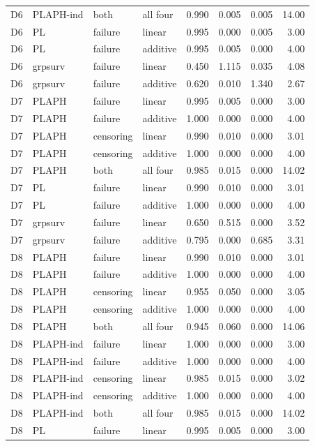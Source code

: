 \begin{longtable}{clllrrrr}
D6 & PLAPH-ind & both & all four & 0.990 & 0.005 & 0.005 & 14.00 \\
D6 & PL & failure & linear & 0.995 & 0.000 & 0.005 & 3.00 \\
D6 & PL & failure & additive & 0.995 & 0.005 & 0.000 & 4.00 \\
D6 & grpsurv & failure & linear & 0.450 & 1.115 & 0.035 & 4.08 \\
D6 & grpsurv & failure & additive & 0.620 & 0.010 & 1.340 & 2.67 \\
D7 & PLAPH & failure & linear & 0.995 & 0.005 & 0.000 & 3.00 \\
D7 & PLAPH & failure & additive & 1.000 & 0.000 & 0.000 & 4.00 \\
D7 & PLAPH & censoring & linear & 0.990 & 0.010 & 0.000 & 3.01 \\
D7 & PLAPH & censoring & additive & 1.000 & 0.000 & 0.000 & 4.00 \\
D7 & PLAPH & both & all four & 0.985 & 0.015 & 0.000 & 14.02 \\
D7 & PL & failure & linear & 0.990 & 0.010 & 0.000 & 3.01 \\
D7 & PL & failure & additive & 1.000 & 0.000 & 0.000 & 4.00 \\
D7 & grpsurv & failure & linear & 0.650 & 0.515 & 0.000 & 3.52 \\
D7 & grpsurv & failure & additive & 0.795 & 0.000 & 0.685 & 3.31 \\
D8 & PLAPH & failure & linear & 0.990 & 0.010 & 0.000 & 3.01 \\
D8 & PLAPH & failure & additive & 1.000 & 0.000 & 0.000 & 4.00 \\
D8 & PLAPH & censoring & linear & 0.955 & 0.050 & 0.000 & 3.05 \\
D8 & PLAPH & censoring & additive & 1.000 & 0.000 & 0.000 & 4.00 \\
D8 & PLAPH & both & all four & 0.945 & 0.060 & 0.000 & 14.06 \\
D8 & PLAPH-ind & failure & linear & 1.000 & 0.000 & 0.000 & 3.00 \\
D8 & PLAPH-ind & failure & additive & 1.000 & 0.000 & 0.000 & 4.00 \\
D8 & PLAPH-ind & censoring & linear & 0.985 & 0.015 & 0.000 & 3.02 \\
D8 & PLAPH-ind & censoring & additive & 1.000 & 0.000 & 0.000 & 4.00 \\
D8 & PLAPH-ind & both & all four & 0.985 & 0.015 & 0.000 & 14.02 \\
D8 & PL & failure & linear & 0.995 & 0.005 & 0.000 & 3.00 \\

\end{longtable}
